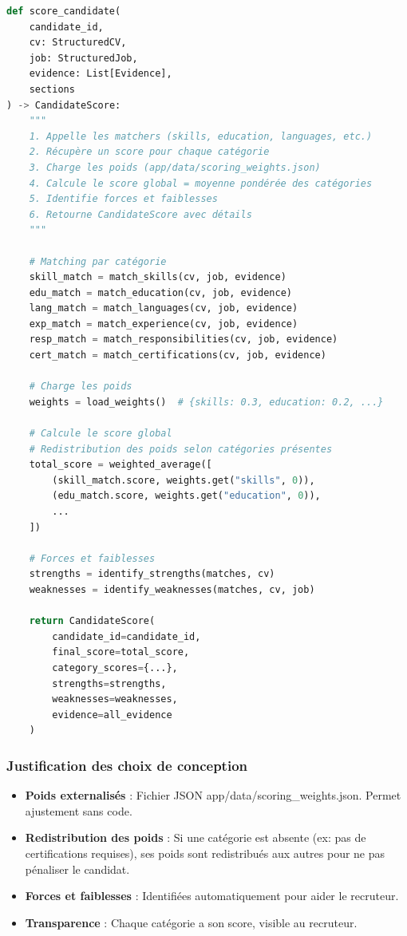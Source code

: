 \documentclass[12pt,a4paper,oneside]{book}
\begin{document}
\begin{lstlisting}[language=Python]
def score_candidate(
    candidate_id,
    cv: StructuredCV,
    job: StructuredJob,
    evidence: List[Evidence],
    sections
) -> CandidateScore:
    """
    1. Appelle les matchers (skills, education, languages, etc.)
    2. Récupère un score pour chaque catégorie
    3. Charge les poids (app/data/scoring_weights.json)
    4. Calcule le score global = moyenne pondérée des catégories
    5. Identifie forces et faiblesses
    6. Retourne CandidateScore avec détails
    """
    
    # Matching par catégorie
    skill_match = match_skills(cv, job, evidence)
    edu_match = match_education(cv, job, evidence)
    lang_match = match_languages(cv, job, evidence)
    exp_match = match_experience(cv, job, evidence)
    resp_match = match_responsibilities(cv, job, evidence)
    cert_match = match_certifications(cv, job, evidence)
    
    # Charge les poids
    weights = load_weights()  # {skills: 0.3, education: 0.2, ...}
    
    # Calcule le score global
    # Redistribution des poids selon catégories présentes
    total_score = weighted_average([
        (skill_match.score, weights.get("skills", 0)),
        (edu_match.score, weights.get("education", 0)),
        ...
    ])
    
    # Forces et faiblesses
    strengths = identify_strengths(matches, cv)
    weaknesses = identify_weaknesses(matches, cv, job)
    
    return CandidateScore(
        candidate_id=candidate_id,
        final_score=total_score,
        category_scores={...},
        strengths=strengths,
        weaknesses=weaknesses,
        evidence=all_evidence
    )
\end{lstlisting}

\subsubsection{Justification des choix de conception}

\begin{itemize}
    \item \textbf{Poids externalisés} : Fichier JSON app/data/scoring\_weights.json. Permet ajustement sans code.
    
    \item \textbf{Redistribution des poids} : Si une catégorie est absente (ex: pas de certifications requises), ses poids sont redistribués aux autres pour ne pas pénaliser le candidat.
    
    \item \textbf{Forces et faiblesses} : Identifiées automatiquement pour aider le recruteur.
    
    \item \textbf{Transparence} : Chaque catégorie a son score, visible au recruteur.
\end{itemize}
\end{document}
